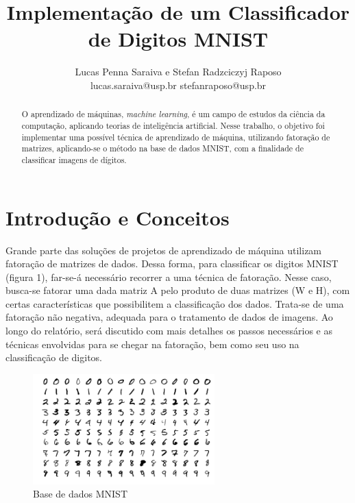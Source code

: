 \documentclass[twocolumn,amsmath,amssymb,floatfix]{revtex4}
\begin{document}

\title{Implementação de um Classificador de Digitos MNIST}

\author{Lucas Penna Saraiva e Stefan Radzciczyj Raposo \\\small lucas.saraiva@usp.br stefanraposo@usp.br}

\begin{abstract}
\baselineskip 11pt
O aprendizado de máquinas, \textit{machine learning}, é um campo de estudos da ciência da computação, aplicando teorias de inteligência artificial. Nesse trabalho, o objetivo foi implementar uma possível técnica de aprendizado de máquina, utilizando fatoração de matrizes, aplicando-se o método na base de dados MNIST, com a finalidade de classificar imagens de dígitos. 
\end{abstract}

\maketitle

\section{Introdução e Conceitos}
Grande parte das soluções de projetos de aprendizado de máquina utilizam fatoração de matrizes de dados. Dessa forma, para classificar os digitos MNIST (figura 1), far-se-á necessário recorrer a uma técnica de fatoração. Nesse caso, busca-se fatorar uma dada matriz A pelo produto de duas matrizes (W e H), com certas características que possibilitem a classificação dos dados. Trata-se de uma fatoração não negativa, adequada para o tratamento de dados de imagens. Ao longo do relatório, será discutido com mais detalhes os passos necessários e as técnicas envolvidas para se chegar na fatoração, bem como seu uso na classificação de digitos.

\begin{figure}[h!]
  \centering
  \includegraphics[width=7cm]{MnistExamples.png}
  \caption{Base de dados MNIST}
\end{figure}
\end{document}
